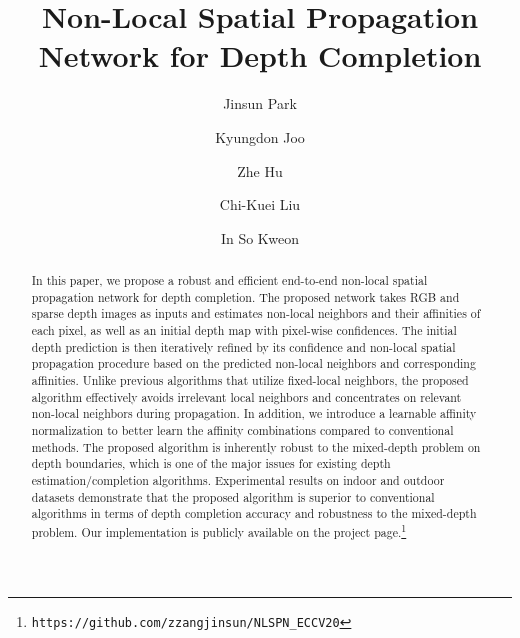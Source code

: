 \documentclass[runningheads]{llncs}
\begin{document}
\pagestyle{headings}
\mainmatter
\def\ECCVSubNumber{1810}  

\title{Non-Local Spatial Propagation Network for Depth Completion} 



\author{
Jinsun Park \and
Kyungdon Joo \and
Zhe Hu \and
Chi-Kuei Liu \and
In So Kweon}



\maketitle

\begin{abstract}
   In this paper, we propose a robust and efficient end-to-end non-local spatial propagation network for depth completion. 
The proposed network takes RGB and sparse depth images as inputs and estimates non-local neighbors and their affinities of each pixel, as well as an initial depth map with pixel-wise confidences. 
The initial depth prediction is then iteratively refined by its confidence and non-local spatial propagation procedure based on the predicted non-local neighbors and corresponding affinities. 
Unlike previous algorithms that utilize fixed-local neighbors, the proposed algorithm effectively avoids irrelevant local neighbors and concentrates on relevant non-local neighbors during propagation. 
In addition, we introduce a learnable affinity normalization to better learn the affinity combinations compared to conventional methods. 
The proposed algorithm is inherently robust to the mixed-depth problem on depth boundaries, which is one of the major issues for existing depth estimation/completion algorithms. 
Experimental results on indoor and outdoor datasets demonstrate that the proposed algorithm is superior to conventional algorithms in terms of depth completion accuracy and robustness to the mixed-depth problem.
Our implementation is publicly available on the project page.\footnote{\texttt{https://github.com/zzangjinsun/NLSPN\_ECCV20}}
\end{abstract}
\end{document}
